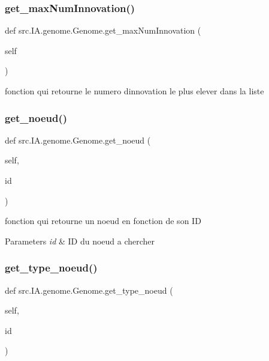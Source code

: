 \subsubsection{\texorpdfstring{get\+\_\+max\+Num\+Innovation()}{get\_maxNumInnovation()}}
{\footnotesize\ttfamily def src.\+I\+A.\+genome.\+Genome.\+get\+\_\+max\+Num\+Innovation (\begin{DoxyParamCaption}\item[{}]{self }\end{DoxyParamCaption})}



fonction qui retourne le numero d\textquotesingle{}innovation le plus elever dans la liste 

\mbox{\label{classsrc_1_1_i_a_1_1genome_1_1_genome_a3ae6b59375d7cb648e6e65b299745136}} 
\subsubsection{\texorpdfstring{get\+\_\+noeud()}{get\_noeud()}}
{\footnotesize\ttfamily def src.\+I\+A.\+genome.\+Genome.\+get\+\_\+noeud (\begin{DoxyParamCaption}\item[{}]{self,  }\item[{}]{id }\end{DoxyParamCaption})}



fonction qui retourne un noeud en fonction de son ID 


\begin{DoxyParams}{Parameters}
{\em id} & ID du noeud a chercher \\
\hline
\end{DoxyParams}
\mbox{\label{classsrc_1_1_i_a_1_1genome_1_1_genome_aacf83c150a5222a2502737adadf41d6e}} 
\subsubsection{\texorpdfstring{get\+\_\+type\+\_\+noeud()}{get\_type\_noeud()}}
{\footnotesize\ttfamily def src.\+I\+A.\+genome.\+Genome.\+get\+\_\+type\+\_\+noeud (\begin{DoxyParamCaption}\item[{}]{self,  }\item[{}]{id }\end{DoxyParamCaption})}



